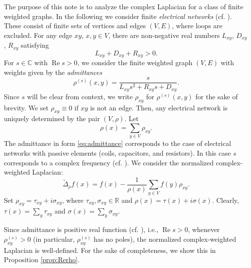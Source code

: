 \documentclass[a4paper,11pt]{amsart}
\theoremstyle{definition}
\renewcommand{\Re}{\operatorname{Re}}%
\newcommand{\R}{\mathbb{R}}
\newcommand{\C}{\mathbb{C}}
\newcommand{\cfreq}{s}
\begin{document}
The purpose of this note is to analyze the complex Laplacian for a class of finite weighted graphs. In the following we consider finite \emph{electrical networks} (cf. \cite{Muranova3,Muranova1,MuranovaThesis}). These consist of finite sets of vertices and edges $(V,E)$, where loops are excluded. For any edge $xy$, $x,y \in V$, there are non-negative real numbers $L_{xy}$, $D_{xy}$, $R_{xy}$ satisfying
\begin{equation*}
L_{xy} + D_{xy} + R_{xy} > 0.
\end{equation*}
For $s \in \C$ with $\Re s > 0$, we consider the finite weighted graph $(V,E)$ with weights given by the \emph{admittances}
\begin{equation}
\label{eq:admittance}
\rho^{(s)}(x,y) = \frac{s}{L_{xy}s^2 + R_{xy} s + D_{xy}}.
\end{equation}
Since $s$ will be clear from context, we write $\rho_{xy}$ for $\rho^{(s)}(x,y)$ for the sake of brevity.
We set $\rho_{xy}\equiv 0$ if $xy$ is not an edge. Then, any electrical network is uniquely determined by the pair $(V,\rho)$.
 Let
\begin{equation*}
\rho(x) = \sum_{y\in V} \rho_{xy}.
\end{equation*}
%
%
The admittance in form \eqref{eq:admittance} corresponds to the case of electrical networks with passive elements (coils, capacitors, and resistors). In this case $\cfreq$ corresponds to a complex frequency  (cf. \cite{Brune, Feynman1, Feynman2}).
We consider the normalized complex-weighted Laplacian:
\begin{equation}\label{Delta}
\widetilde \Delta_\rho f(x)=f(x)-\dfrac{1}{\rho(x)}\sum_{y\in V} f(y)\rho_{xy}.
\end{equation}
Set ${\rho_{xy}=\tau_{xy}+i\sigma_{xy}}$, where $\tau_{xy}, \sigma_{xy} \in \R$ and ${\rho(x)=\tau(x)+i\sigma(x)}$. Clearly, $\tau(x)=\sum_{y}\tau_{xy}$ and $\sigma(x)=\sum_{y}\sigma_{xy}$. 

Since admittance is positive real function (cf. \cite{Brune, Muranova3, MuranovaThesis}), i.e., $\Re \cfreq >0$, whenever $\rho^{(s)}_{xy}>0$ (in particular, $\rho^{(s)}_{xy}$ has no poles), the normalized complex-weighted Laplacian is well-defined. For the sake of completeness, we show this in Proposition \ref{prop:Rerho}.
\end{document}
